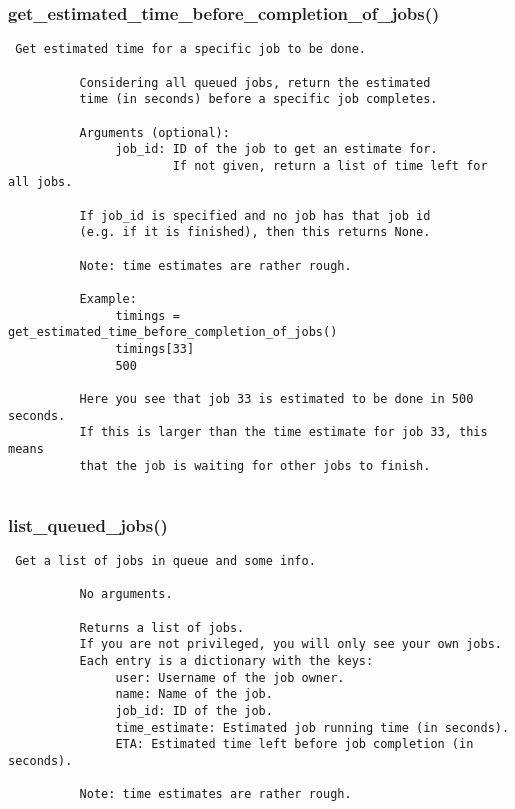 \subsubsection{get\_estimated\_time\_before\_completion\_of\_jobs()}


\begin{verbatim}
 Get estimated time for a specific job to be done.
          
          Considering all queued jobs, return the estimated
          time (in seconds) before a specific job completes.

          Arguments (optional):
               job_id: ID of the job to get an estimate for.
                       If not given, return a list of time left for all jobs.

          If job_id is specified and no job has that job id
          (e.g. if it is finished), then this returns None.

          Note: time estimates are rather rough.

          Example:
               timings = get_estimated_time_before_completion_of_jobs()
               timings[33]
               500

          Here you see that job 33 is estimated to be done in 500 seconds.
          If this is larger than the time estimate for job 33, this means
          that the job is waiting for other jobs to finish.
          
\end{verbatim}
\subsubsection{list\_queued\_jobs()}


\begin{verbatim}
 Get a list of jobs in queue and some info.

          No arguments.

          Returns a list of jobs.
          If you are not privileged, you will only see your own jobs.
          Each entry is a dictionary with the keys:
               user: Username of the job owner.
               name: Name of the job.
               job_id: ID of the job.
               time_estimate: Estimated job running time (in seconds).
               ETA: Estimated time left before job completion (in seconds).

          Note: time estimates are rather rough.
          
\end{verbatim}
